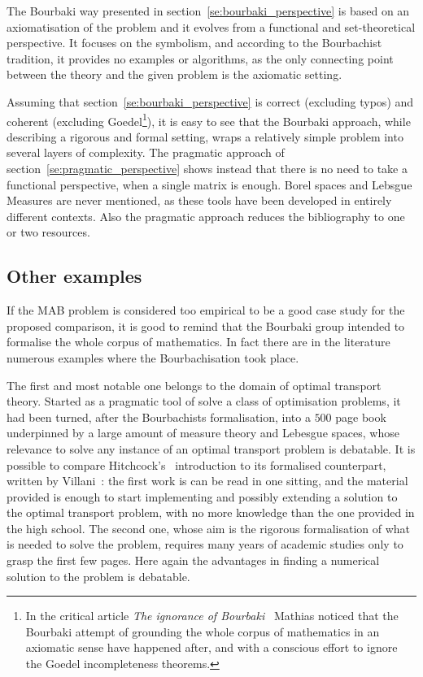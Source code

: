 \documentclass[]{scrartcl}
\theoremstyle{definition}
\begin{document}
The Bourbaki way presented in section~\ref{se:bourbaki_perspective} is based on an axiomatisation of the problem and it evolves from a functional and set-theoretical perspective. It focuses on the symbolism, and according to the Bourbachist tradition, it provides no examples or algorithms, as the only connecting point between the theory and the given problem is the axiomatic setting.

Assuming that section~\ref{se:bourbaki_perspective} is correct (excluding typos) and coherent (excluding Goedel\footnote{
    In the critical article \emph{The ignorance of Bourbaki}~\cite{mathias1992ignorance} Mathias noticed that the Bourbaki attempt of grounding the whole corpus of mathematics in an axiomatic sense have happened after, and with a conscious effort to ignore the Goedel incompleteness theorems.
}), it is easy to see that the Bourbaki approach, while describing a rigorous and formal setting, wraps a relatively simple problem into several layers of complexity.
The pragmatic approach of section~\ref{se:pragmatic_perspective} shows instead that there is no need to take a functional perspective, when a single matrix is enough. Borel spaces and Lebsgue Measures are never mentioned, as these tools have been developed in entirely different contexts. Also the pragmatic approach reduces the bibliography to one or two resources.

\subsection*{Other examples}

If the MAB problem is considered too empirical to be a good case study for the proposed comparison, it is good to remind that the Bourbaki group intended to formalise the whole corpus of mathematics. In fact there are in the literature numerous examples where the Bourbachisation took place. 

The first and most notable one belongs to the domain of optimal transport theory. Started as a pragmatic tool of solve a class of optimisation problems, it had been turned, after the Bourbachists formalisation, into a $500$ page book underpinned by a large amount of measure theory and Lebesgue spaces, whose relevance to solve any instance of an optimal transport problem is debatable. It is possible to compare Hitchcock's~\cite{hitchcock1941distribution} introduction to its formalised counterpart, written by Villani~\cite{villani2003topics}: the first work is can be read in one sitting, and the material provided is enough to start implementing and possibly extending a solution to the optimal transport problem, with no more knowledge than the one provided in the high school. The second one, whose aim is the rigorous formalisation of what is needed to solve the problem, requires many years of academic studies only to grasp the first few pages. Here again the advantages in finding a numerical solution to the problem is debatable.
\end{document}
